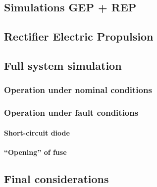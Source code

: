 \begin{englishtext}

    \chapter[Simulations]{Simulations GEP + REP}


    \section{Rectifier Electric Propulsion}


    \section{Full system simulation}


    \subsection{Operation under nominal conditions}


    \subsection{Operation under fault conditions}


    \subsubsection{Short-circuit diode}


    \subsubsection{``Opening'' of fuse}


    \section{Final considerations}

\end{englishtext}

